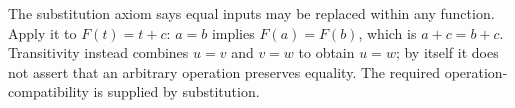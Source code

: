 The substitution axiom says equal inputs may be replaced within any function. Apply it to $ F(t)=t+c $: $ a=b $ implies $ F(a)=F(b)$, which is $ a+c=b+c $. Transitivity instead combines $ u=v $ and $ v=w $ to obtain $ u=w $; by itself it does not assert that an arbitrary operation preserves equality. The required operation-compatibility is supplied by substitution.
